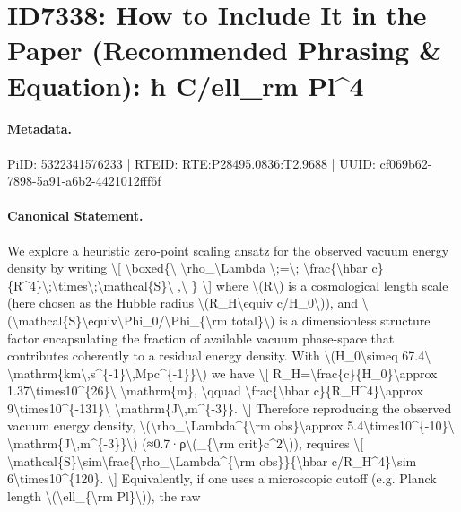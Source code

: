 \section*{ID7338: How to Include It in the Paper (Recommended Phrasing \& Equation): ħ C/ell\_rm Pl\textasciicircum{}4}
\paragraph{Metadata.}
PiID: 5322341576233 | RTEID: RTE:P28495.0836:T2.9688 | UUID: cf069b62-7898-5a91-a6b2-4421012fff6f

\paragraph{Canonical Statement.}
We explore a heuristic zero-point scaling ansatz for the observed vacuum energy density by writing \textbackslash{}[ \textbackslash{}boxed\{\textbackslash{} \textbackslash{}rho\_\textbackslash{}Lambda \textbackslash{};=\textbackslash{}; \textbackslash{}frac\{\textbackslash{}hbar c\}\{R\textasciicircum{}4\}\textbackslash{};\textbackslash{}times\textbackslash{};\textbackslash{}mathcal\{S\}\textbackslash{} ,\textbackslash{} \} \textbackslash{}] where \textbackslash{}(R\textbackslash{}) is a cosmological length scale (here chosen as the Hubble radius \textbackslash{}(R\_H\textbackslash{}equiv c/H\_0\textbackslash{})), and \textbackslash{}(\textbackslash{}mathcal\{S\}\textbackslash{}equiv\textbackslash{}Phi\_0/\textbackslash{}Phi\_\{\textbackslash{}rm total\}\textbackslash{}) is a dimensionless structure factor encapsulating the fraction of available vacuum phase-space that contributes coherently to a residual energy density. With \textbackslash{}(H\_0\textbackslash{}simeq 67.4\textbackslash{} \textbackslash{}mathrm\{km\textbackslash{},s\textasciicircum{}\{-1\}\textbackslash{},Mpc\textasciicircum{}\{-1\}\}\textbackslash{}) we have \textbackslash{}[ R\_H=\textbackslash{}frac\{c\}\{H\_0\}\textbackslash{}approx 1.37\textbackslash{}times10\textasciicircum{}\{26\}\textbackslash{} \textbackslash{}mathrm\{m\}, \textbackslash{}qquad \textbackslash{}frac\{\textbackslash{}hbar c\}\{R\_H\textasciicircum{}4\}\textbackslash{}approx 9\textbackslash{}times10\textasciicircum{}\{-131\}\textbackslash{} \textbackslash{}mathrm\{J\textbackslash{},m\textasciicircum{}\{-3\}\}. \textbackslash{}] Therefore reproducing the observed vacuum energy density, \textbackslash{}(\textbackslash{}rho\_\textbackslash{}Lambda\textasciicircum{}\{\textbackslash{}rm obs\}\textbackslash{}approx 5.4\textbackslash{}times10\textasciicircum{}\{-10\}\textbackslash{} \textbackslash{}mathrm\{J\textbackslash{},m\textasciicircum{}\{-3\}\}\textbackslash{}) (≈0.7·ρ\textbackslash{}(\_\{\textbackslash{}rm crit\}c\textasciicircum{}2\textbackslash{})), requires \textbackslash{}[ \textbackslash{}mathcal\{S\}\textbackslash{}sim\textbackslash{}frac\{\textbackslash{}rho\_\textbackslash{}Lambda\textasciicircum{}\{\textbackslash{}rm obs\}\}\{\textbackslash{}hbar c/R\_H\textasciicircum{}4\}\textbackslash{}sim 6\textbackslash{}times10\textasciicircum{}\{120\}. \textbackslash{}] Equivalently, if one uses a microscopic cutoff (e.g. Planck length \textbackslash{}(\textbackslash{}ell\_\{\textbackslash{}rm Pl\}\textbackslash{})), the raw 